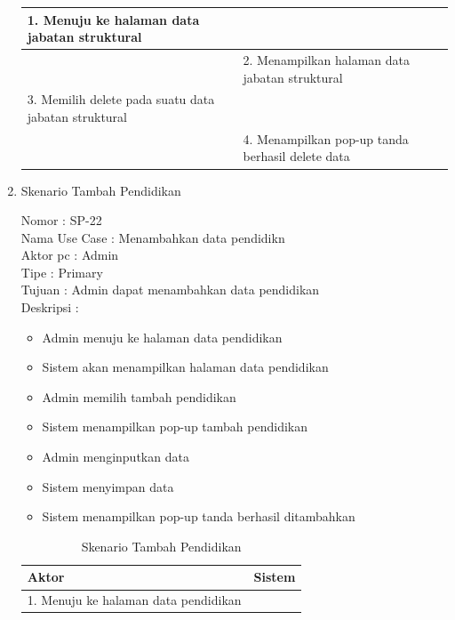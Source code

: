 \begin{enumerate}
\begin{table}
\begin{tabular}{ | p{55mm} | p{70mm}|}
		1.	Menuju ke halaman data jabatan struktural &  \\
		
		\hline
		
		&  2.	Menampilkan halaman data jabatan struktural\\
		
		\hline
		
		3. Memilih delete pada suatu data jabatan struktural& \\
		
		\hline
		
		& 4.	Menampilkan pop-up tanda berhasil delete data \\
		\hline
		
	\end{tabular}
\end{table}

\item Skenario Tambah Pendidikan

Nomor \kern 3.6pc : SP-22 \\
Nama Use Case : Menambahkan data pendidikn \\
Aktor  pc : Admin \\
Tipe \kern 4.6pc : Primary \\
Tujuan \kern 3.6pc : Admin dapat menambahkan data pendidikan \\
Deskripsi \kern 2.5pc : 

\begin{itemize}
	\item Admin menuju ke halaman data pendidikan
	\item Sistem akan menampilkan halaman data pendidikan
	\item Admin memilih tambah pendidikan
	\item Sistem menampilkan pop-up tambah pendidikan
	\item Admin menginputkan data
	\item Sistem menyimpan data
	\item Sistem menampilkan pop-up tanda berhasil ditambahkan
	
\end{itemize}

\begin{table}
	\caption{Skenario Tambah Pendidikan}
	\centering
	\begin{tabular}{ | l | p{65mm} |}
		\hline 
		\textbf{Aktor} & \textbf{Sistem} \\
		\hline
		
		1.	Menuju ke halaman data pendidikan &  \\
		

\end{tabular}
\end{table}
\end{enumerate}
